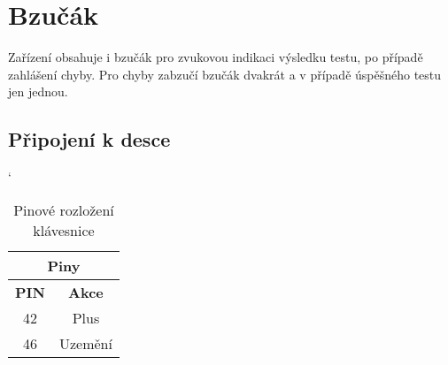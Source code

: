 
\section{Bzučák}
Zařízení obsahuje i bzučák pro zvukovou indikaci výsledku testu, po případě zahlášení chyby. Pro chyby zabzučí bzučák dvakrát a v případě úspěšného testu jen jednou.

\subsection*{Připojení k desce}
\begin{table} [h!]
	\caption{Pinové rozložení klávesnice}
	\label{table:pinKB}
	\centering
	\catcode` %
	\begin{tabular}[c]{|| c | c ||}
	\hline
		\multicolumn{2}{||c||}{Piny} \\
	\hline
 		 \textbf{PIN} & \textbf{Akce} \\
	\hline
		42 &  Plus \\
	\hline
		46 & Uzemění \\
	\hline
	\end{tabular}
\end{table}
